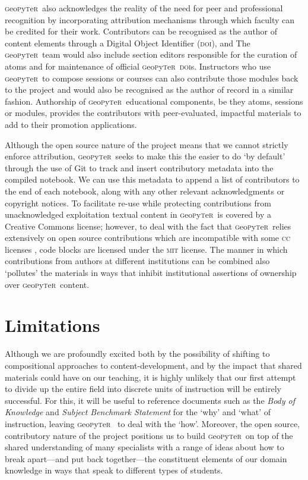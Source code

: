 \documentclass[letter, 11pt]{article}
\newcommand{\gp}{\textsc{g}eo\textsc{p}y\textsc{t}e\textsc{r}~\/}
\begin{document}
\gp also acknowledges the reality of the need for peer and professional
recognition by incorporating attribution mechanisms through which faculty can be
credited for their work. Contributors can be recognised as the author of content
elements through a Digital Object Identifier (\textsc{doi}), and The \gp team
would also include section editors responsible for the curation of atoms and for
maintenance of official \gp \textsc{doi}s. Instructors who use \gp to compose
sessions or courses can also contribute those modules back to the project and
would also be recognised as the author of record in a similar fashion.
Authorship of \gp educational components, be they atoms, sessions or modules,
provides the contributors with peer-evaluated, impactful materials to add to
their promotion applications.

Although the open source nature of the project means that we cannot strictly
enforce attribution, \gp seeks to make this the easier to do `by default'
through the use of Git to track and insert contributory metadata into the
compiled notebook. We can use this metadata to append a list of contributors to
the end of each notebook, along with any other relevant acknowledgments or
copyright notices. To facilitate re-use while protecting contributions from
unacknowledged exploitation textual content in \gp is covered by a Creative
Commons license; however, to deal with the fact that \gp relies extensively on
open source contributions which are incompatible with some \textsc{cc} licenses
\citep[see discussion in][]{osswatch2013}, code blocks are licensed under the
\textsc{mit} license. The manner in which contributions from authors at
different institutions can be combined also `pollutes' the materials in ways
that inhibit institutional assertions of ownership over \gp content.

\section{Limitations}\label{limitations}

Although we are profoundly excited both by the possibility of shifting to
compositional approaches to content-development, and by the impact that shared
materials could have on our teaching, it is highly unlikely that our first
attempt to divide up the entire field into discrete units of instruction will be
entirely successful. For this, it will be useful to reference documents such as
the \textit{Body of Knowledge} \citep{bok2018} and \textit{Subject Benchmark
Statement} \citep{QAA2014} for the `why' and `what' of instruction, leaving \gp
to deal with the `how'. Moreover, the open source, contributory nature of the
project positions us to build \gp on top of the shared understanding of many
specialists with a range of ideas about how to break apart---and put back
together---the constituent elements of our domain knowledge in ways that speak
to different types of students.
\end{document}
